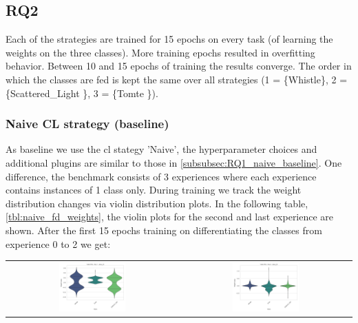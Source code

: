 \subsection{RQ2}
\label{subsec:RQ2}
Each of the strategies are trained for 15 epochs on every task (of learning the weights on the three classes). More training epochs resulted in overfitting behavior. Between 10 and 15 epochs of training the results converge. The order in which the classes are fed is kept the same over all strategies (1 = \{Whistle\}, 2 = \{Scattered\_Light \}, 3 = \{Tomte \}).

\subsubsection{Naive CL strategy (baseline)}
As baseline we use the \acrshort{cl} stategy 'Naive', the hyperparameter choices and additional plugins are similar to those in \ref{subsubsec:RQ1_naive_baseline}. One difference, the benchmark consists of 3 experiences where each experience contains instances of 1 class only. 
During training we track the weight distribution changes via violin distribution plots. In the following table, \ref{tbl:naive_fd_weights}, the violin plots for the second and last experience are shown.
After the first 15 epochs training on differentiating the classes from experience 0 to 2 we get: 
\begin{center}
\begin{tabular}{cc}
\includegraphics[width=0.4\textwidth]{Images/naive_fd_exp_1.png} & \includegraphics[width=0.4\textwidth]{Images/naive_fd_exp_2.png} \\
\end{tabular}
\label{tbl:naive_fd_weights}
\end{center}

